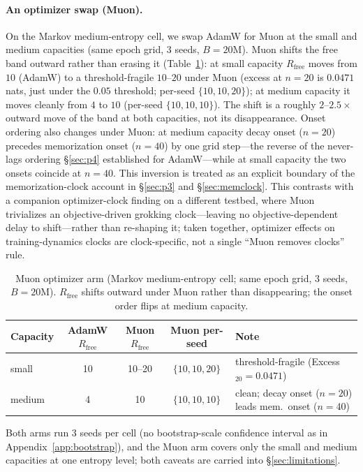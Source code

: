 \documentclass[11pt]{article}
\begin{document}
\paragraph{An optimizer swap (Muon).}
On the Markov medium-entropy cell, we swap AdamW for Muon \citep{jordan2024muon} at
the small and medium capacities (same epoch grid, 3 seeds, $B{=}20$M). Muon shifts
the free band outward rather than erasing it (Table~\ref{tab:muon}): at small
capacity $R_{\mathrm{free}}$ moves from $10$ (AdamW) to a threshold-fragile
$10$--$20$ under Muon (excess at $n=20$ is $0.0471$ nats, just under the $0.05$
threshold; per-seed $\{10,10,20\}$); at medium capacity it moves cleanly from $4$
to $10$ (per-seed $\{10,10,10\}$). The shift is a roughly $2$--$2.5\times$ outward
move of the band at both capacities, not its disappearance. Onset ordering also
changes under Muon: at medium capacity decay onset ($n=20$) precedes memorization
onset ($n=40$) by one grid step---the reverse of the never-lags ordering
\S\ref{sec:p4} established for AdamW---while at small capacity the two onsets
coincide at $n=40$. This inversion is treated as an explicit boundary of the
memorization-clock account in \S\ref{sec:p3} and \S\ref{sec:memclock}. This contrasts with a companion optimizer-clock finding on a
different testbed, where Muon trivializes an objective-driven grokking clock---leaving
no objective-dependent delay to shift---rather than re-shaping it; taken together,
optimizer effects on training-dynamics clocks are
clock-specific, not a single ``Muon removes clocks'' rule.

\begin{table}[htbp]
\centering
\caption{Muon optimizer arm (Markov medium-entropy cell; same epoch grid, 3 seeds,
$B=20$M). $R_{\mathrm{free}}$ shifts outward under Muon rather than disappearing;
the onset order flips at medium capacity.}
\label{tab:muon}
\scriptsize
\begin{tabular}{@{}lcccl@{}}
\toprule
Capacity & AdamW $R_{\mathrm{free}}$ & Muon $R_{\mathrm{free}}$ & Muon per-seed & Note \\
\midrule
small  & 10 & 10--20 & $\{10,10,20\}$ & threshold-fragile (Excess$_{20}=0.0471$) \\
medium & 4  & 10     & $\{10,10,10\}$ & clean; decay onset ($n{=}20$) leads mem.\ onset ($n{=}40$) \\
\bottomrule
\end{tabular}
\end{table}

Both arms run 3 seeds per cell (no bootstrap-scale confidence interval as in
Appendix~\ref{app:bootstrap}), and the Muon arm covers only the small and medium
capacities at one entropy level; both caveats are carried into
\S\ref{sec:limitations}.
\end{document}
